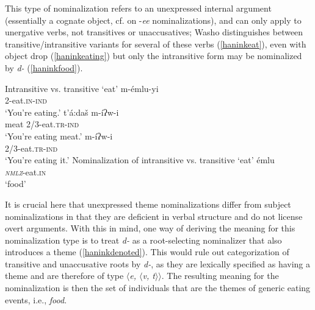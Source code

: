 \documentclass[output=paper]{langscibook}
\begin{document}
This type of nominalization refers to an unexpressed internal argument (essentially a cognate object, cf. \citet{barker1998} on -{\itshape ee} nominalizations), and can only apply to unergative verbs, not transitives or unaccusatives; Washo distinguishes between transitive/intransitive variants for several of these verbs (\ref{haninkeat}), even with object drop (\ref{haninkeating}) but only the intransitive form may be nominalized by {\itshape d-} (\ref{haninkfood}).


\ea Intransitive vs. transitive `eat'\label{haninkeat}
\ea \gll m-émlu-yi\\
2-eat.{\scshape in}-{\scshape ind}\\
\glt `You're eating.'
\ex \gll t'á:daš m-íʔw-i\\
meat 2/3-eat.{\scshape tr}-{\scshape ind}\\
\glt `You're eating meat.'
\ex \gll  m-íʔw-i\\
2/3-eat.{\scshape tr}-{\scshape ind}\\
\glt `You're eating it.' \hfill \citep[149]{jacobsen1979} \label{haninkeating}
\z
\ex Nominalization of intransitive vs. transitive `eat'\label{haninkfood}
\ea {}émlu\\
\textit{\textsc{nmlz}}-eat.{\scshape in}\\
\glt `food'
\z
\z

It is crucial here that unexpressed theme nominalizations differ from subject nominalizations in that they are deficient in verbal structure and do not license overt arguments. With this in mind, one way of deriving the meaning for this nominalization type is to treat {\itshape d-} as a root-selecting nominalizer that also introduces a theme (\ref{haninkdenoted}). This would rule out categorization of transitive and unaccusative roots by {\itshape d-}, as they are lexically specified as having a theme and are therefore of type \textit{$\langle$e, $\langle$v, t$\rangle$$\rangle$}. The resulting meaning for the nominalization is then the set of individuals that are the themes of  generic eating events, i.e., {\itshape food}.

\ea 
{}
\label{haninkdenoted}
\z
\z
\end{document}
